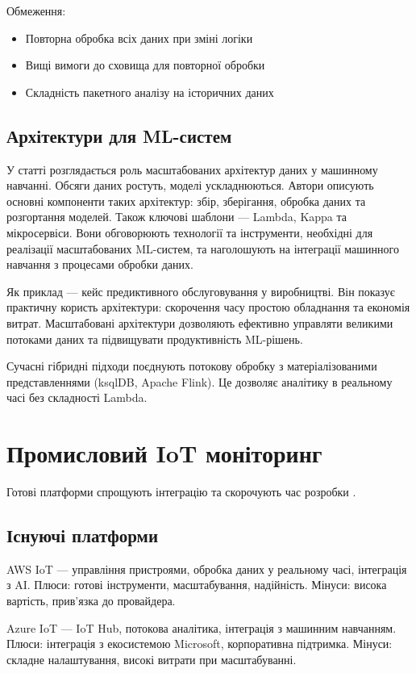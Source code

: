 Обмеження:
\begin{itemize}
    \item Повторна обробка всіх даних при зміні логіки
    \item Вищі вимоги до сховища для повторної обробки
    \item Складність пакетного аналізу на історичних даних
\end{itemize}

\subsection{Архітектури для ML-систем}

У статті \cite{vajpayee2024building} розглядається роль масштабованих архітектур даних у машинному навчанні. Обсяги даних ростуть, моделі ускладнюються. Автори описують основні компоненти таких архітектур: збір, зберігання, обробка даних та розгортання моделей. Також ключові шаблони --- Lambda, Kappa та мікросервіси. Вони обговорюють технології та інструменти, необхідні для реалізації масштабованих ML-систем, та наголошують на інтеграції машинного навчання з процесами обробки даних.

Як приклад --- кейс предиктивного обслуговування у виробництві. Він показує практичну користь архітектури: скорочення часу простою обладнання та економія витрат. Масштабовані архітектури дозволяють ефективно управляти великими потоками даних та підвищувати продуктивність ML-рішень.

Сучасні гібридні підходи поєднують потокову обробку з матеріалізованими представленнями (ksqlDB, Apache Flink). Це дозволяє аналітику в реальному часі без складності Lambda.

\section{Промисловий IoT моніторинг}

Готові платформи спрощують інтеграцію та скорочують час розробки \cite{ferencz2024cloud}.

\subsection{Існуючі платформи}

AWS IoT --- управління пристроями, обробка даних у реальному часі, інтеграція з AI. Плюси: готові інструменти, масштабування, надійність. Мінуси: висока вартість, прив'язка до провайдера.

Azure IoT --- IoT Hub, потокова аналітика, інтеграція з машинним навчанням. Плюси: інтеграція з екосистемою Microsoft, корпоративна підтримка. Мінуси: складне налаштування, високі витрати при масштабуванні.

